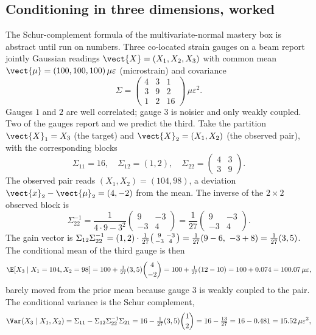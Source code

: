 \subsection{Conditioning in three dimensions, worked}

The Schur-complement formula of the multivariate-normal mastery box is
abstract until run on numbers. Three co-located strain gauges on a beam
report jointly Gaussian readings $\vect{X} = (X_{1}, X_{2}, X_{3})$ with
common mean $\vect{\mu} = (100, 100, 100)\,\mu\varepsilon$ (microstrain)
and covariance
\[
\Sigma = \begin{pmatrix}
4 & 3 & 1 \\
3 & 9 & 2 \\
1 & 2 & 16
\end{pmatrix}\,\mu\varepsilon^{2}.
\]
Gauges $1$ and $2$ are well correlated; gauge $3$ is noisier and only
weakly coupled. Two of the gauges report and we predict the third. Take
the partition $\vect{X}_{1} = X_{3}$ (the target) and $\vect{X}_{2} =
(X_{1}, X_{2})$ (the observed pair), with the corresponding blocks
\[
\Sigma_{11} = 16, \quad
\Sigma_{12} = (1, 2), \quad
\Sigma_{22} = \begin{pmatrix} 4 & 3 \\ 3 & 9 \end{pmatrix}.
\]
The observed pair reads $(X_{1}, X_{2}) = (104, 98)$, a deviation
$\vect{x}_{2} - \vect{\mu}_{2} = (4, -2)$ from the mean. The inverse of
the $2 \times 2$ observed block is
\[
\Sigma_{22}^{-1} = \frac{1}{4 \cdot 9 - 3^{2}}
\begin{pmatrix} 9 & -3 \\ -3 & 4 \end{pmatrix}
= \frac{1}{27}\begin{pmatrix} 9 & -3 \\ -3 & 4 \end{pmatrix}.
\]
The gain vector is $\Sigma_{12}\Sigma_{22}^{-1} = (1, 2) \cdot
\tfrac{1}{27}\begin{psmallmatrix} 9 & -3 \\ -3 & 4 \end{psmallmatrix}
= \tfrac{1}{27}(9 - 6,\ -3 + 8) = \tfrac{1}{27}(3, 5)$. The conditional
mean of the third gauge is then
\[
\E[X_{3} \mid X_{1} = 104, X_{2} = 98]
= 100 + \tfrac{1}{27}(3, 5)\binom{4}{-2}
= 100 + \tfrac{1}{27}(12 - 10) = 100 + 0.074 = 100.07\,\mu\varepsilon,
\]
barely moved from the prior mean because gauge $3$ is weakly coupled to
the pair. The conditional variance is the Schur complement,
\[
\Var(X_{3} \mid X_{1}, X_{2}) = \Sigma_{11} -
\Sigma_{12}\Sigma_{22}^{-1}\Sigma_{21}
= 16 - \tfrac{1}{27}(3, 5)\binom{1}{2}
= 16 - \tfrac{13}{27} = 16 - 0.481 = 15.52\,\mu\varepsilon^{2},
\]
